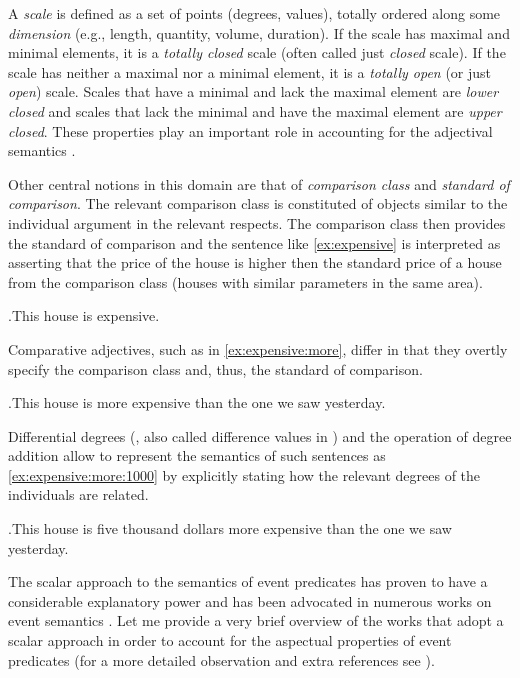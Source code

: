  A \textit{scale} is defined as a set of points (degrees, values), %
 totally ordered along some \textit{dimension} (e.g., length, quantity, volume, duration). If the scale has maximal and minimal elements, it is a \textit{totally closed} scale (often called just \textit{closed} scale). If the scale has neither a maximal nor a minimal element, it is a \textit{totally open} (or just \textit{open}) scale. Scales that have a minimal and lack the maximal element are \textit{lower closed} and scales that lack the minimal and have the maximal element are \textit{upper closed}. These properties play an important role in accounting for the adjectival semantics \citep[see, e.g.,][]{KennedyMcNally:05, RotsteinWinter:04, KaganAlexeyenko:10}.
 
Other central notions in this domain are that of \textit{comparison class} and \textit{standard of comparison}. The relevant comparison class \citep[see, e.g.][]{Klein:80, KennedyMcNally:05, Kennedy:07} is constituted of objects similar to the individual argument in the relevant respects. The comparison class then provides the standard of comparison and the sentence like \ref{ex:expensive} is interpreted as asserting that the price of the house is higher then the standard price of a house from the comparison class (houses with similar parameters in the same area).
 
 \ex.\label{ex:expensive}This house is expensive.

Comparative adjectives, such as in \ref{ex:expensive:more}, differ in that they overtly specify the comparison class and, thus, the standard of comparison. 

 \ex.\label{ex:expensive:more}This house is more expensive than the one we saw yesterday.
 
Differential degrees (\citealt{Kennedy:01}, also called difference values in \citealt{KennedyLevin:02}) and the operation of degree addition \citep{KennedyLevin:02} allow to represent the semantics of such sentences as \ref{ex:expensive:more:1000} by explicitly stating how the relevant degrees of the individuals are related.
 
 \ex.\label{ex:expensive:more:1000}This house is five thousand dollars more expensive than the one we saw yesterday.

The scalar approach to the semantics of event predicates has proven to have a considerable explanatory power and has been advocated in numerous works on event semantics \citep[see, e.g.,][]{Ramchand:97, Hay:99, KennedyLevin:02, CaudalNicolas:05, FilipRothstein:05, Kearns:07, KennedyLevin:08, Filip:08, Pinon:08, Rappaport:08, Rappaport:11, McNally:11}. Let me provide a very brief overview of the works that adopt a scalar approach in order to account for the aspectual properties of event predicates (for a more detailed observation and extra references see \citealt{Arsenijevic:13}).

